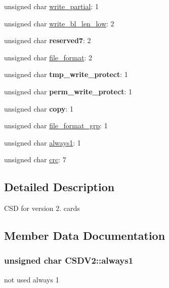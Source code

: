 \begin{DoxyCompactItemize}
\item 
unsigned char \hyperlink{struct_c_s_d_v2_a3aa87bccca13deac8c91464b8d0cd6b9}{write\+\_\+partial}\+: 1
\item 
unsigned char \hyperlink{struct_c_s_d_v2_a1d64afb6ea52bea58bdcc583ebd1d90f}{write\+\_\+bl\+\_\+len\+\_\+low}\+: 2
\item 
unsigned char {\bfseries reserved7}\+: 2\hypertarget{struct_c_s_d_v2_a1f4b39bbcb0a11e8faff76f3e0009507}{}\label{struct_c_s_d_v2_a1f4b39bbcb0a11e8faff76f3e0009507}

\item 
unsigned char \hyperlink{struct_c_s_d_v2_a9b62ba9447a21e359aef85441755500e}{file\+\_\+format}\+: 2
\item 
unsigned char {\bfseries tmp\+\_\+write\+\_\+protect}\+: 1\hypertarget{struct_c_s_d_v2_adbfe402ab90de708b34d0c54aa644764}{}\label{struct_c_s_d_v2_adbfe402ab90de708b34d0c54aa644764}

\item 
unsigned char {\bfseries perm\+\_\+write\+\_\+protect}\+: 1\hypertarget{struct_c_s_d_v2_a0aa606189952beb4a6c30d95fb4be64a}{}\label{struct_c_s_d_v2_a0aa606189952beb4a6c30d95fb4be64a}

\item 
unsigned char {\bfseries copy}\+: 1\hypertarget{struct_c_s_d_v2_a28e87b4139d304eb4ddddadd9ae3d547}{}\label{struct_c_s_d_v2_a28e87b4139d304eb4ddddadd9ae3d547}

\item 
unsigned char \hyperlink{struct_c_s_d_v2_af21c794c85486d738e4b8bff3a6d9317}{file\+\_\+format\+\_\+grp}\+: 1
\item 
unsigned char \hyperlink{struct_c_s_d_v2_ab7031b6fc7926ecc0acd6cff50c2c5d1}{always1}\+: 1
\item 
unsigned char \hyperlink{struct_c_s_d_v2_ac5b251d008704ff292ea77b55e4bc97d}{crc}\+: 7
\end{DoxyCompactItemize}


\subsection{Detailed Description}
C\+SD for version 2. cards 

\subsection{Member Data Documentation}
\subsubsection[{\texorpdfstring{always1}{always1}}]{\setlength{\rightskip}{0pt plus 5cm}unsigned char C\+S\+D\+V2\+::always1}\hypertarget{struct_c_s_d_v2_ab7031b6fc7926ecc0acd6cff50c2c5d1}{}\label{struct_c_s_d_v2_ab7031b6fc7926ecc0acd6cff50c2c5d1}
not used always 1 
